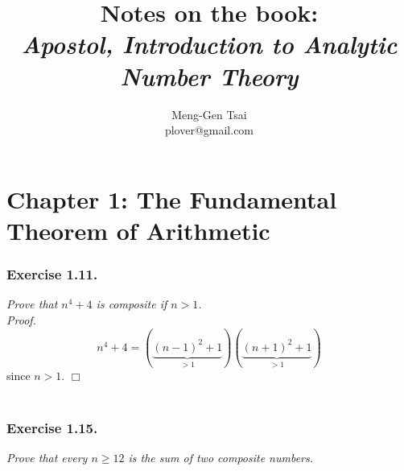 \documentclass{article}
\title{\textbf{Notes on the book: \\
\emph{Apostol, Introduction to Analytic Number Theory}}}
\author{Meng-Gen Tsai \\ plover@gmail.com}
\begin{document}
\maketitle
\tableofcontents












\newpage
\section*{Chapter 1: The Fundamental Theorem of Arithmetic \\}






\subsubsection*{Exercise 1.11.}
\emph{Prove that $n^4 + 4$ is composite if $n > 1$.} \\



\emph{Proof.}
  \[
    n^4 + 4
    = (\underbrace{(n-1)^2 + 1}_{> 1})(\underbrace{(n+1)^2 + 1}_{> 1})
  \]
  since $n > 1$.
$\Box$ \\\\






\subsubsection*{Exercise 1.15.}
\emph{Prove that every $n \geq 12$ is the sum of two composite numbers.} \\
\end{document}
